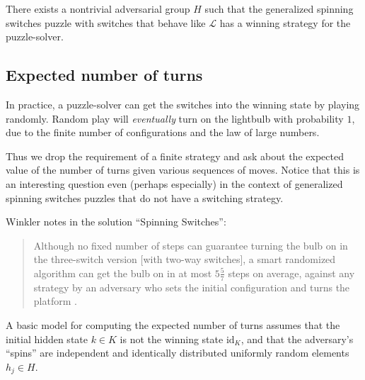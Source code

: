 \begin{conjecture}
  There exists a nontrivial adversarial group $H$ such that the generalized
  spinning switches puzzle with switches that behave like $\mathcal{L}$ has
  a winning strategy for the puzzle-solver.
\end{conjecture}

\subsection{Expected number of turns}
In practice, a puzzle-solver can get the switches into the winning state by
playing randomly.
Random play will \textit{eventually} turn on the lightbulb with probability $1$,
due to the finite number of configurations and the law of large numbers.

Thus we drop the requirement of a finite strategy and
ask about the expected value of the number of turns given
various sequences of moves.
Notice that this is an interesting question even (perhaps especially)
in the context of generalized spinning switches puzzles that do not have a
switching strategy.

Winkler \cite{Winkler2021}
notes in the solution ``Spinning Switches'':
\begin{quote}
  Although no fixed number of steps can guarantee turning the bulb on in the
  three-switch version [with two-way switches],
  a smart randomized algorithm can get the bulb on in at most $5 \frac{5}{7}$
  steps on average, against any strategy by an adversary who sets the initial
  configuration and turns the platform \cite{Winkler2021}.
\end{quote}

%

%
A basic model for computing the expected number of turns assumes that
the initial hidden state $k \in K$ is not the winning state $\mathrm{id}_K$,
and that the adversary's ``spins'' are independent and identically distributed
uniformly random elements $h_j \in H$.


